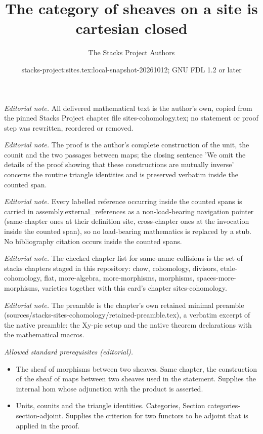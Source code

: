 \documentclass[10pt,a4paper]{amsart}
\title{The category of sheaves on a site is cartesian closed}
\author{The Stacks Project Authors}
\date{stacks-project:sites.tex:local-snapshot-20261012; GNU FDL 1.2 or later}
\theoremstyle{plain}
\theoremstyle{definition}
\theoremstyle{remark}
\numberwithin{equation}{subsection}
\begin{document}
\maketitle
\noindent\textit{Editorial note.} All delivered mathematical text is the author's own, copied from the pinned Stacks Project chapter file sites-cohomology.tex; no statement or proof step was rewritten, reordered or removed.\par\medskip
\noindent\textit{Editorial note.} The proof is the author's complete construction of the unit, the counit and the two passages between maps; the closing sentence 'We omit the details of the proof showing that these constructions are mutually inverse' concerns the routine triangle identities and is preserved verbatim inside the counted span.\par\medskip
\noindent\textit{Editorial note.} Every labelled reference occurring inside the counted spans is carried in assembly.external\_references as a non-load-bearing navigation pointer (same-chapter ones at their definition site, cross-chapter ones at the invocation inside the counted span), so no load-bearing mathematics is replaced by a stub. No bibliography citation occurs inside the counted spans.\par\medskip
\noindent\textit{Editorial note.} The checked chapter list for same-name collisions is the set of stacks chapters staged in this repository: chow, cohomology, divisors, etale-cohomology, flat, more-algebra, more-morphisms, morphisms, spaces-more-morphisms, varieties together with this card's chapter sites-cohomology.\par\medskip
\noindent\textit{Editorial note.} The preamble is the chapter's own retained minimal preamble (sources/stacks-sites-cohomology/retained-preamble.tex), a verbatim excerpt of the native preamble: the Xy-pic setup and the native theorem declarations with the mathematical macros.\par\medskip
\noindent\textit{Allowed standard prerequisites (editorial).}\begin{itemize}
\item The sheaf of morphisms between two sheaves. Same chapter, the construction of the sheaf of maps between two sheaves used in the statement. Supplies the internal hom whose adjunction with the product is asserted.
\item Units, counits and the triangle identities. Categories, Section categories-section-adjoint. Supplies the criterion for two functors to be adjoint that is applied in the proof.
\end{itemize}\medskip
\end{document}
